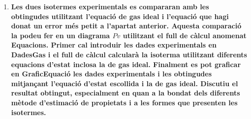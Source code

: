 \documentclass[a4paper]{article}
\begin{document}
\begin{enumerate}[resume]
    \item \textbf{Les dues isotermes experimentals es compararan amb les obtingudes utilitzant l’equació de gas ideal i l’equació que hagi donat un error més petit a l’apartat anterior. Aquesta comparació la podeu fer en un diagrama $Pv$ utilitzant el full de càlcul anomenat \textbf{Equacions}. Primer cal introduir les dades experimentals en \textbf{DadesGas} i el full de càlcul calcularà la isoterma utilitzant diferents equacions d’estat inclosa la de gas ideal. Finalment es pot graficar en \textbf{GraficEquació} les dades experimentals i les obtingudes mitjançant l’equació d’estat escollida i la de gas ideal. Discutiu el resultat obtingut, especialment en quan a la bondat dels diferents mètode d’estimació de propietats i a les formes que presenten les isotermes.}
\end{enumerate}

\begin{figure}[H]
    \centering
\end{figure}
\end{document}
